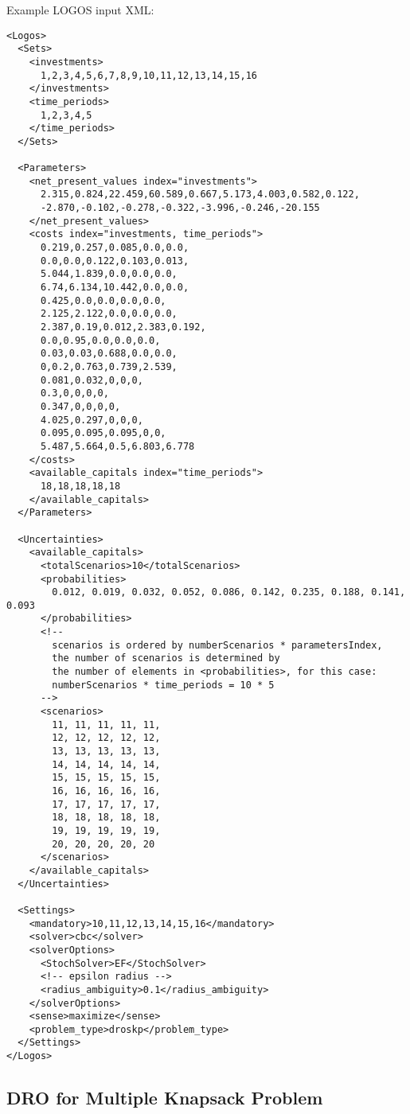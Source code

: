 Example LOGOS input XML:
\begin{lstlisting}[style=XML]
<Logos>
  <Sets>
    <investments>
      1,2,3,4,5,6,7,8,9,10,11,12,13,14,15,16
    </investments>
    <time_periods>
      1,2,3,4,5
    </time_periods>
  </Sets>

  <Parameters>
    <net_present_values index="investments">
      2.315,0.824,22.459,60.589,0.667,5.173,4.003,0.582,0.122,
      -2.870,-0.102,-0.278,-0.322,-3.996,-0.246,-20.155
    </net_present_values>
    <costs index="investments, time_periods">
      0.219,0.257,0.085,0.0,0.0,
      0.0,0.0,0.122,0.103,0.013,
      5.044,1.839,0.0,0.0,0.0,
      6.74,6.134,10.442,0.0,0.0,
      0.425,0.0,0.0,0.0,0.0,
      2.125,2.122,0.0,0.0,0.0,
      2.387,0.19,0.012,2.383,0.192,
      0.0,0.95,0.0,0.0,0.0,
      0.03,0.03,0.688,0.0,0.0,
      0,0.2,0.763,0.739,2.539,
      0.081,0.032,0,0,0,
      0.3,0,0,0,0,
      0.347,0,0,0,0,
      4.025,0.297,0,0,0,
      0.095,0.095,0.095,0,0,
      5.487,5.664,0.5,6.803,6.778
    </costs>
    <available_capitals index="time_periods">
      18,18,18,18,18
    </available_capitals>
  </Parameters>

  <Uncertainties>
    <available_capitals>
      <totalScenarios>10</totalScenarios>
      <probabilities>
        0.012, 0.019, 0.032, 0.052, 0.086, 0.142, 0.235, 0.188, 0.141, 0.093
      </probabilities>
      <!--
        scenarios is ordered by numberScenarios * parametersIndex,
        the number of scenarios is determined by
        the number of elements in <probabilities>, for this case:
        numberScenarios * time_periods = 10 * 5
      -->
      <scenarios>
        11, 11, 11, 11, 11,
        12, 12, 12, 12, 12,
        13, 13, 13, 13, 13,
        14, 14, 14, 14, 14,
        15, 15, 15, 15, 15,
        16, 16, 16, 16, 16,
        17, 17, 17, 17, 17,
        18, 18, 18, 18, 18,
        19, 19, 19, 19, 19,
        20, 20, 20, 20, 20
      </scenarios>
    </available_capitals>
  </Uncertainties>

  <Settings>
    <mandatory>10,11,12,13,14,15,16</mandatory>
    <solver>cbc</solver>
    <solverOptions>
      <StochSolver>EF</StochSolver>
      <!-- epsilon radius -->
      <radius_ambiguity>0.1</radius_ambiguity>
    </solverOptions>
    <sense>maximize</sense>
    <problem_type>droskp</problem_type>
  </Settings>
</Logos>
\end{lstlisting}


\subsection{DRO for Multiple Knapsack Problem}
\label{DRO_MKP}

